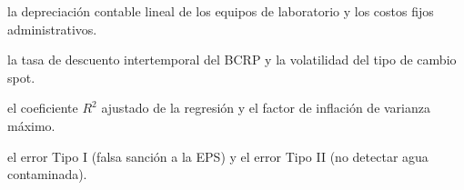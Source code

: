 \begin{opts}
    \item la depreciación contable lineal de los equipos de laboratorio y los costos fijos administrativos.
    \item la tasa de descuento intertemporal del BCRP y la volatilidad del tipo de cambio spot.
    \item el coeficiente $R^2$ ajustado de la regresión y el factor de inflación de varianza máximo.
    \item el error Tipo I (falsa sanción a la EPS) y el error Tipo II (no detectar agua contaminada).
\end{opts}

